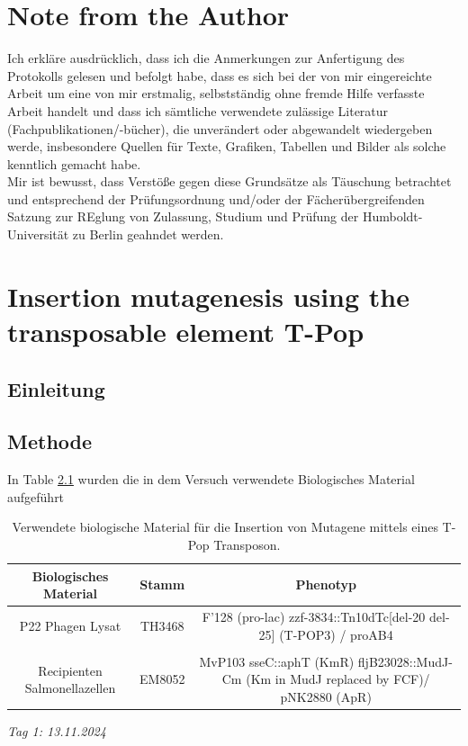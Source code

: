 \documentclass[oneside,10pt,a4paper]{report}
\begin{document}
	\chapter{Note from the Author}
	Ich erkläre ausdrücklich, dass ich die Anmerkungen zur Anfertigung des Protokolls gelesen und befolgt habe, dass es sich bei der von mir eingereichte Arbeit um eine von mir erstmalig, selbstständig ohne fremde Hilfe verfasste Arbeit handelt und dass ich sämtliche verwendete zulässige Literatur (Fachpublikationen/-bücher), die unverändert oder abgewandelt wiedergeben werde, insbesondere Quellen für Texte, Grafiken, Tabellen und Bilder als solche kenntlich gemacht habe.\\
	Mir ist bewusst, dass Verstöße gegen diese Grundsätze als Täuschung betrachtet und entsprechend der Prüfungsordnung und/oder der Fächerübergreifenden Satzung zur REglung von Zulassung, Studium und Prüfung der Humboldt-Universität zu Berlin geahndet werden.
	
	
	\chapter{Insertion mutagenesis using the transposable element T-Pop}	
	
		\section{Einleitung}
		
		\section{Methode}
		In Table \ref{tab: exp2-biologisches Material} wurden die in dem Versuch verwendete Biologisches Material aufgeführt
		
			\begin{table}[H]
			\centering
			\caption{Verwendete biologische Material für die Insertion von Mutagene mittels eines T-Pop Transposon.}
			\label{tab: exp2-biologisches Material}
			\begin{tabular}{ccc}
				\toprule
				Biologisches Material& Stamm & Phenotyp\\
				\midrule
				\multirow{2}{*}{P22 Phagen Lysat} & \multirow{2}{*}{TH3468} & \multirow{2}{*}{\parbox[t]{9cm}{F’128 (pro-lac) zzf-3834::Tn10dTc[del-20 del-25] (T-POP3) / proAB4}}\\
				&&\\
				&&\\
				\multirow{3}{*}{\parbox[t]{3cm}{Recipienten Salmonellazellen}} & \multirow{3}{*}{EM8052} &\multirow{3}{*}{\parbox[t]{9cm}{MvP103 sseC::aphT (KmR) fljB23028::MudJ-Cm (Km in MudJ replaced by FCF)/ pNK2880 (ApR)}} \\
				&&\\
				&&\\

				\bottomrule			
			\end{tabular}
		\end{table}
		\textit{Tag 1: 13.11.2024}
		
\end{document}
